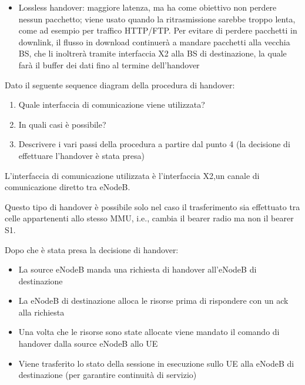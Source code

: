 \begin{questions}
\begin{solution}
\begin{itemize}
            \item Lossless handover: maggiore latenza, ma ha come obiettivo non perdere nessun pacchetto; viene usato quando la ritrasmissione sarebbe troppo lenta, come ad esempio per traffico HTTP/FTP. Per evitare di perdere pacchetti in downlink, il flusso in download continuerà a mandare pacchetti alla vecchia BS, che li inoltrerà tramite interfaccia X2 alla BS di destinazione, la quale farà il buffer dei dati fino al termine dell'handover
        \end{itemize}
    \end{solution}
    
    \question Dato il seguente sequence diagram della procedura di handover: 
    \begin{enumerate}
        \item Quale interfaccia di comunicazione viene utilizzata?
        
        \item In quali casi è possibile?
        
        \item Descrivere i vari passi della procedura a partire dal punto 4 (la decisione di effettuare l'handover è stata presa)
    \end{enumerate}
    
    \begin{solution}
        L'interfaccia di comunicazione utilizzata è l'interfaccia X2,un canale di comunicazione diretto tra eNodeB.
        
        Questo tipo di handover è possibile solo nel caso il trasferimento sia effettuato tra celle appartenenti allo stesso MMU, i.e., cambia il bearer radio ma non il bearer S1.
        
        Dopo che è stata presa la decisione di handover: 
        \begin{itemize}
            \item La source eNodeB manda una richiesta di handover all'eNodeB di destinazione
            
            \item La eNodeB di destinazione alloca le risorse prima di rispondere con un ack alla richiesta
            
            \item Una volta che le risorse sono state allocate viene mandato il comando di handover dalla source eNodeB allo UE
            
            \item Viene trasferito lo stato della sessione in esecuzione sullo UE alla eNodeB di destinazione (per garantire continuità di servizio)
            

\end{itemize}
\end{solution}
\end{questions}
